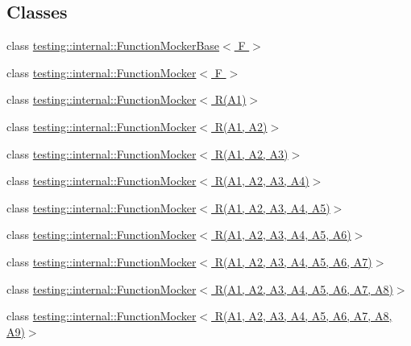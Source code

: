 \subsection*{Classes}
\begin{DoxyCompactItemize}
\item 
class \hyperlink{classtesting_1_1internal_1_1FunctionMockerBase}{testing\+::internal\+::\+Function\+Mocker\+Base$<$ F $>$}
\item 
class \hyperlink{classtesting_1_1internal_1_1FunctionMocker}{testing\+::internal\+::\+Function\+Mocker$<$ F $>$}
\item 
class \hyperlink{classtesting_1_1internal_1_1FunctionMocker_3_01R_07A1_08_4}{testing\+::internal\+::\+Function\+Mocker$<$ R(\+A1)$>$}
\item 
class \hyperlink{classtesting_1_1internal_1_1FunctionMocker_3_01R_07A1_00_01A2_08_4}{testing\+::internal\+::\+Function\+Mocker$<$ R(\+A1, A2)$>$}
\item 
class \hyperlink{classtesting_1_1internal_1_1FunctionMocker_3_01R_07A1_00_01A2_00_01A3_08_4}{testing\+::internal\+::\+Function\+Mocker$<$ R(\+A1, A2, A3)$>$}
\item 
class \hyperlink{classtesting_1_1internal_1_1FunctionMocker_3_01R_07A1_00_01A2_00_01A3_00_01A4_08_4}{testing\+::internal\+::\+Function\+Mocker$<$ R(\+A1, A2, A3, A4)$>$}
\item 
class \hyperlink{classtesting_1_1internal_1_1FunctionMocker_3_01R_07A1_00_01A2_00_01A3_00_01A4_00_01A5_08_4}{testing\+::internal\+::\+Function\+Mocker$<$ R(\+A1, A2, A3, A4, A5)$>$}
\item 
class \hyperlink{classtesting_1_1internal_1_1FunctionMocker_3_01R_07A1_00_01A2_00_01A3_00_01A4_00_01A5_00_01A6_08_4}{testing\+::internal\+::\+Function\+Mocker$<$ R(\+A1, A2, A3, A4, A5, A6)$>$}
\item 
class \hyperlink{classtesting_1_1internal_1_1FunctionMocker_3_01R_07A1_00_01A2_00_01A3_00_01A4_00_01A5_00_01A6_00_01A7_08_4}{testing\+::internal\+::\+Function\+Mocker$<$ R(\+A1, A2, A3, A4, A5, A6, A7)$>$}
\item 
class \hyperlink{classtesting_1_1internal_1_1FunctionMocker_3_01R_07A1_00_01A2_00_01A3_00_01A4_00_01A5_00_01A6_00_01A7_00_01A8_08_4}{testing\+::internal\+::\+Function\+Mocker$<$ R(\+A1, A2, A3, A4, A5, A6, A7, A8)$>$}
\item 
class \hyperlink{classtesting_1_1internal_1_1FunctionMocker_3_01R_07A1_00_01A2_00_01A3_00_01A4_00_01A5_00_01A6_00_01A7_00_01A8_00_01A9_08_4}{testing\+::internal\+::\+Function\+Mocker$<$ R(\+A1, A2, A3, A4, A5, A6, A7, A8, A9)$>$}

\end{DoxyCompactItemize}
